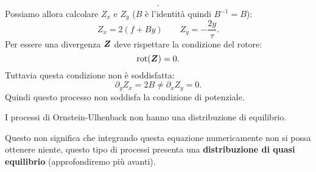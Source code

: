 \begin{exmp}[Processo di OU]
\[\begin{aligned}
    .\end{aligned}\]
    Possiamo allora calcolare $Z_x$ e $Z_y$ ($B$ è l'identità quindi $B^{-1} = B$):
    \[
	 Z_x = 2(f+By) \qquad
	 Z_y = -\frac{2y}{\tau}
    .\] 
    Per essere una divergenza $\boldsymbol{Z}$ deve rispettare la condizione del rotore:
    \[
	\text{rot}(\boldsymbol{Z}) = 0
    .\] 
    Tuttavia questa condizione non è soddisfatta:
    \[
        \partial_{y}Z_x = 2B \neq \partial_{x}Z_y = 0
    .\] 
    Quindi questo processo non soddisfa la condizione di potenziale.
    \begin{greenbox}{}
        I processi di Ornstein-Ulhenback non hanno una distribuzione di equilibrio.
    \end{greenbox}
    \noindent
    Questo non significa che integrando questa equazione numericamente non si possa ottenere niente, questo tipo di processi presenta una \textbf{distribuzione di quasi equilibrio} (approfondiremo più avanti).
\end{exmp}
\noindent
